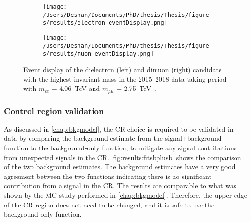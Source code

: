 \begin{figure}[!htpb]
    \centering
    \begin{subfigure}[b]{0.49\textwidth}
        \centering
        \texttt{[image: /Users/Deshan/Documents/PhD/thesis/Thesis/figures/results/electron\_eventDisplay.png]}
        \label{fig:eventDisplay1}
    \end{subfigure}
    \begin{subfigure}[b]{0.49\textwidth}
        \centering
        \texttt{[image: /Users/Deshan/Documents/PhD/thesis/Thesis/figures/results/muon\_eventDisplay.png]}
        \label{fig:eventDisplay2}
    \end{subfigure}
    \caption[Event display of the dielectron and dimuon candidate with the highest invariant mass in the 2015--2018 data taking period]{
    Event display of the dielectron (left) and dimuon (right) candidate with the highest invariant mass in the 2015--2018 data taking period with $m_{ee}$ = \SI{4.06}{\tera\electronvolt} and $m_{\mu\mu}$ = \SI{2.75}{\tera\electronvolt}~\cite{Aad:2019fac}.
    }
    \label{fig:eventDisplay}
\end{figure}

\subsubsection{Control region validation}
As discussed in \cref{chap:bkgmodel}, the CR choice is required to be validated in data by comparing the background estimate from the signal+background function to the background-only function, to mitigate any signal contributions from unexpected signals in the CR. \cref{fig:results:fitsbplusb} shows the comparison of the two background estimates. The background estimates have a very good agreement between the two functions indicating there is no significant contribution from a signal in the CR. The results are comparable to what was shown by the MC study performed in \cref{chap:bkgmodel}. Therefore, the upper edge of the CR region does not need to be changed, and it is safe to use the background-only function. 


